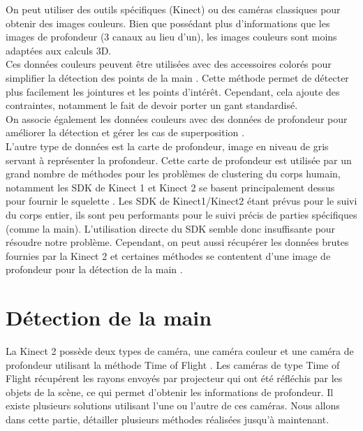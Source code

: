 On peut utiliser des outils spécifiques (Kinect) ou des caméras classiques pour obtenir des images couleurs.
Bien que possédant plus d'informations que les images de profondeur (3 canaux au lieu d'un), les images couleurs sont moins adaptées aux calculs 3D.\\

Ces données couleurs peuvent être utilisées avec des accessoires colorés pour simplifier la détection des points de la main \cite{wang2009real}.
Cette méthode permet de détecter plus facilement les jointures et les points d'intér\^{e}t. 
Cependant, cela ajoute des contraintes, notamment le fait de devoir porter un gant standardisé.\\

On associe également les données couleurs avec des données de profondeur pour améliorer la détection et gérer les cas de superposition \cite{van2011combining}.\\

L'autre type de données est la carte de profondeur, image en niveau de gris servant à représenter la profondeur. 
Cette carte de profondeur est utilisée par un grand nombre de méthodes pour les problèmes de clustering du corps humain, notamment les SDK de Kinect 1 et Kinect 2 se basent principalement dessus pour fournir le squelette \cite{export:145347}.
Les SDK de Kinect1/Kinect2 étant prévus pour le suivi du corps entier, ils sont peu performants pour le suivi précis de parties spécifiques (comme la main).
L'utilisation directe du SDK semble donc insuffisante pour résoudre notre problème. Cependant, on peut aussi récupérer les données brutes fournies par la Kinect 2 et certaines méthodes se contentent d'une image de profondeur pour la détection de la main \cite{export:238453}.

\section{Détection de la main}

La Kinect 2 possède deux types de caméra, une caméra couleur et une caméra de profondeur utilisant la méthode 
\og Time of Flight \fg. Les caméras de type \og Time of Flight \fg
récupérent les rayons envoyés par projecteur qui ont été réfléchis par les objets de la scène, ce qui permet d'obtenir les informations de profondeur. 
Il existe plusieurs solutions utilisant l'une ou l'autre de ces caméras. Nous allons
dans cette partie, détailler plusieurs méthodes réalisées jusqu'à maintenant.

